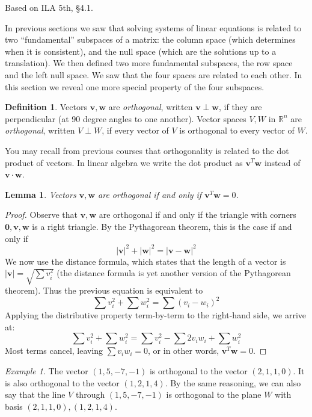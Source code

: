\documentclass[11pt,oneside]{amsbook}
\newcommand{\R}{\mathbb R}
\theoremstyle{definition}
\theoremstyle{plain}
\newtheorem{lemma}[theorem]{Lemma}
\theoremstyle{definition}
\newtheorem{definition}[theorem]{Definition}
\theoremstyle{remark}
\newtheorem{example}[theorem]{Example}
\numberwithin{equation}{section}
\numberwithin{figure}{section}
\begin{document}
Based on ILA 5th, \S 4.1.

In previous sections we saw that solving systems of linear equations is related to two ``fundamental'' subspaces of a matrix: the column space (which determines when it is consistent), and the null space (which are the solutions up to a translation). We then defined two more fundamental subspaces, the row space and the left null space. We saw that the four spaces are related to each other. In this section we reveal one more special property of the four subspaces.

\begin{definition}
  Vectors $\mathbf{v},\mathbf{w}$ are \emph{orthogonal}, written $\mathbf{v}\perp\mathbf{w}$, if they are perpendicular (at 90 degree angles to one another). Vector spaces $V,W$ in $\R^n$ are \emph{orthogonal}, written $V\perp W$, if every vector of $V$ is orthogonal to every vector of $W$.
\end{definition}

You may recall from previous courses that orthogonality is related to the dot product of vectors. In linear algebra we write the dot product as $\mathbf{v}^T\mathbf{w}$ instead of $\mathbf{v}\cdot\mathbf{w}$.

\begin{lemma}
  Vectors $\mathbf{v},\mathbf{w}$ are orthogonal if and only if $\mathbf{v}^T\mathbf{w}=0$.
\end{lemma}

\begin{proof}
  Observe that $\mathbf{v},\mathbf{w}$ are orthogonal if and only if the triangle with corners $\mathbf{0},\mathbf{v},\mathbf{w}$ is a right triangle. By the Pythagorean theorem, this is the case if and only if
  \[|\mathbf{v}|^2+|\mathbf{w}|^2=|\mathbf{v-w}|^2
  \]
  We now use the distance formula, which states that the length of a vector is $|\mathbf{v}|=\sqrt{\sum v_i^2}$ (the distance formula is yet another version of the Pythagorean theorem). Thus the previous equation is equivalent to
  \[\sum v_i^2+\sum w_i^2=\sum(v_i-w_i)^2
  \]
  Applying the distributive property term-by-term to the right-hand side, we arrive at:
  \[\sum v_i^2+\sum w_i^2=\sum v_i^2-\sum 2v_iw_i+\sum w_i^2
  \]
  Most terms cancel, leaving $\sum v_iw_i=0$, or in other words, $\mathbf{v}^T\mathbf{w}=0$.
\end{proof}

\begin{example}
  The vector $(1,5,-7,-1)$ is orthogonal to the vector $(2,1,1,0)$. It is also orthogonal to the vector $(1,2,1,4)$. By the same reasoning, we can also say that the line $V$ through $(1,5,-7,-1)$ is orthogonal to the plane $W$ with basis $(2,1,1,0),(1,2,1,4)$.
\end{example}
\end{document}
